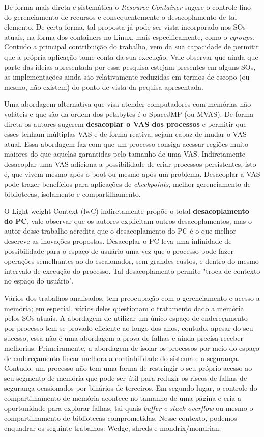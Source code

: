 De forma mais direta e sistemática o \textit{Resource Container} sugere o
controle fino do gerenciamento de recursos e consequentemente o desacoplamento
de tal elemento. De certa forma, tal proposta já pode ser vista incorporado nos
SOs atuais, na forma dos containers no Linux, mais especificamente, como o
\textit{cgroups}. Contudo a principal contribuição do trabalho, vem da sua
capacidade de permitir que a própria aplicação tome conta da sua execução.
Vale observar que ainda que parte das ideias apresentada por essa pesquisa
estejam presentes em alguns SOs, as implementações ainda são relativamente
reduzidas em termos de escopo (ou mesmo, não existem) do ponto de vista da
pequisa apresentada.

Uma abordagem alternativa que visa atender computadores com memórias não
voláteis e que são da ordem dos petabytes é o SpaceJMP (ou MVAS). De forma
direta os autores sugerem \textbf{desacoplar o VAS dos processos} e permitir
que esses tenham múltiplas VAS e de forma reativa, sejam capaz de mudar o VAS
atual. Essa abordagem faz com que um processo consiga acessar regiões muito
maiores do que aquelas garantidas pelo tamanho de uma VAS. Indiretamente
desacoplar uma VAS adiciona a possibilidade de criar processos persistentes,
isto é, que vivem mesmo após o boot ou mesmo após um problema. Desacoplar a VAS
pode trazer benefícios para aplicações de \textit{checkpoints}, melhor
gerenciamento de bibliotecas, isolamento e compartilhamento.

O Light-weight Context (lwC) indiretamente propõe o total
\textbf{desacoplamento do PC}, vale observar que os autores explicitam outros
desacoplamentos, mas o autor desse trabalho acredita que o desacoplamento do PC
é o que melhor descreve as inovações propostas. Desacoplar o PC leva uma
infinidade de possibilidade para o espaço de usuário uma vez que o processo
pode fazer operações semelhantes ao do escalonador, sem grandes custos, e
dentro do mesmo intervalo de execução do processo. Tal desacoplamento permite
"troca de contexto no espaço do usuário".

Vários dos trabalhos analisados, tem preocupação com o gerenciamento e acesso a
memória; em especial, vários deles questionam o tratamento dado a memória pelos
SOs atuais.  A abordagem de utilizar um único espaço de endereçamento por
processo tem se provado eficiente ao longo dos anos, contudo, apesar do seu
sucesso, essa não é uma abordagem a prova de falhas e ainda precisa receber
melhorias.  Primeiramente, a abordagem de isolar os processos por meio do
espaço de endereçamento linear melhora a confiabilidade do sistema e a
segurança.  Contudo, um processo não tem uma forma de restringir o seu próprio
acesso ao seu segmento de memória que pode ser útil para reduzir os riscos de
falhas de segurança ocasionados por binários de terceiros. Em segundo lugar, o
controle do compartilhamento de memória acontece no tamanho de uma página e
cria a oportunidade para explorar falhas, tai quais \emph{buffer e stack
overflow} ou mesmo o compartilhamento de bibliotecas comprometidas. Nesse
contexto, podemos enquadrar os seguinte trabalhos: Wedge, shreds e
mondrix/mondrian.

